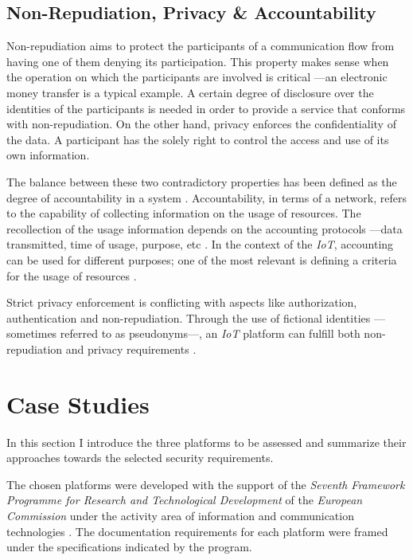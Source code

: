 \documentclass[journal]{IEEEtran}
\begin{document}
  \subsection{Non-Repudiation, Privacy \& Accountability}
  Non-repudiation aims to protect the participants of a communication flow from having one of them denying its participation. This property makes sense when the operation on which the participants are involved is critical ---an electronic money transfer is a typical example. A certain degree of disclosure over the identities of the participants is needed in order to provide a service that conforms with non-repudiation. On the other hand, privacy enforces the confidentiality of the data. A participant has the solely right to control the access and use of its own information.

  The balance between these two contradictory properties has been defined as the degree of accountability in a system \cite{Bassi2013}. Accountability, in terms of a network, refers to the capability of collecting information on the usage of resources. The recollection of the usage information depends on the accounting protocols ---data transmitted, time of usage, purpose, etc  \cite{Sklavos2007}. In the context of the \emph{IoT}, accounting can be used for different purposes; one of the most relevant is defining a criteria for the usage of resources \cite{Bauge2010}.

  Strict privacy enforcement is conflicting with aspects like authorization, authentication and non-repudiation. Through the use of fictional identities ---sometimes referred to as pseudonyms---, an \emph{IoT} platform can fulfill both non-repudiation and privacy requirements \cite{Baldini2012}. 
  
\section{Case Studies}
  In this section I introduce the three platforms to be assessed and summarize their approaches towards the selected security requirements.

  The chosen platforms were developed with the support of the \emph{Seventh Framework Programme for Research and Technological Development} of the \emph{European Commission} under the activity area of information and communication technologies \cite{FP7}\cite{FP7-ICT}\cite{ICT}. The documentation requirements for each platform were framed under the specifications indicated by the program.
\end{document}
